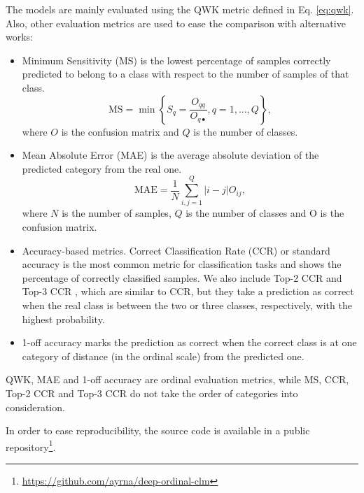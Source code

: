 \documentclass[preprint]{elsarticle}
\begin{document}
The models are mainly evaluated using the QWK metric defined in Eq. \eqref{eq:qwk}. Also, other evaluation metrics are used to ease the comparison with alternative works:
\begin{itemize}
	\item Minimum Sensitivity (MS) \cite{cruz2014metrics} is the lowest percentage of samples correctly predicted to belong to a class with respect to the number of samples of that class.
	\begin{equation}
	\nonumber
	\text{MS} = \min\left\lbrace S_q = \frac{O_{qq}}{O_{q\bullet}}, q = 1, ..., Q \right\rbrace,
	\end{equation}
	where $O$ is the confusion matrix and $Q$ is the number of classes.
	
	\item Mean Absolute Error (MAE) \cite{cruz2014metrics} is the average absolute deviation of the predicted category from the real one.
	\begin{equation}
	\nonumber
	\text{MAE} = \frac{1}{N} \sum^Q_{i,j = 1} |i-j|O_{ij},
	\end{equation}
	where $N$ is the number of samples, $Q$ is the number of classes and O is the confusion matrix.
	
	\item Accuracy-based metrics. Correct Classification Rate (CCR) or standard accuracy is the most common metric for classification tasks and shows the percentage of correctly classified samples. We also include Top-2 CCR and Top-3 CCR \cite{beckham2017unimodal}, which are similar to CCR, but they take a prediction as correct when the real class is between the two or three classes, respectively, with the highest probability.
	
	\item 1-off accuracy \cite{eidinger2014age,chen2016cascaded,levi2015age} marks the prediction as correct when the correct class is at one category of distance (in the ordinal scale) from the predicted one.
\end{itemize}
QWK, MAE and 1-off accuracy are ordinal evaluation metrics, while MS, CCR, Top-2 CCR and Top-3 CCR do not take the order of categories into consideration.

In order to ease reproducibility, the source code is available in a public repository\footnote{\url{https://github.com/ayrna/deep-ordinal-clm}}.
\end{document}
